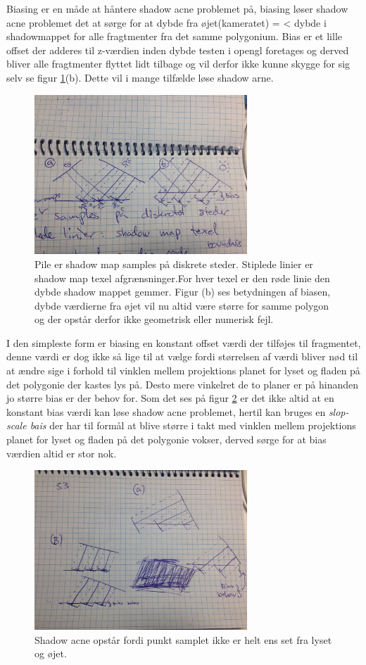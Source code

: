 \documentclass[11pt,a4paper]{article}
\begin{document}
Biasing er en måde at håntere shadow acne problemet på, biasing løser shadow acne problemet det at sørge for at dybde fra øjet(kameratet) = < dybde i shadowmappet for alle fragtmenter fra det samme polygonium.  Bias er et lille offset der adderes til z-værdien inden dybde testen i opengl foretages og derved bliver alle fragtmenter flyttet lidt tilbage og vil derfor ikke kunne skygge for sig selv se figur \ref{S2}(b). Dette vil i mange tilfælde løse shadow arne.

\begin{figure}[ht!]
\centering
\includegraphics[width=80mm]{img/S2.jpg}
\caption{Pile er shadow map samples på diskrete steder. Stiplede linier er shadow map texel afgrænsninger.For hver texel er den røde linie den dybde shadow mappet gemmer. Figur (b) ses betydningen af biasen, dybde værdierne fra øjet vil nu altid være større for samme polygon og der opstår derfor ikke geometrisk eller numerisk fejl.}
\label{S2}
\end{figure}

I den simpleste form er biasing en konstant offset værdi der tilføjes til fragmentet, denne værdi er dog ikke så lige til at vælge fordi størrelsen af  værdi bliver nød til at ændre sige i forhold til vinklen mellem projektions planet for lyset og fladen på det polygonie der kastes lys på. Desto mere vinkelret de to planer er på hinanden jo større bias er der behov for. Som det ses på figur \ref{S3} er det ikke altid at en konstant bias værdi kan løse shadow acne problemet, hertil kan bruges en \textit{slop-scale bais} der har til formål at blive større i takt med vinklen mellem  projektions planet for lyset og fladen på det polygonie vokser, derved sørge for at bias værdien altid er stor nok. 


\begin{figure}[ht!]
\centering
\includegraphics[width=80mm]{img/S3.jpg}
\caption{Shadow acne opstår fordi punkt samplet ikke er helt ens set fra lyset og øjet.}
\label{S3}
\end{figure}
\end{document}
